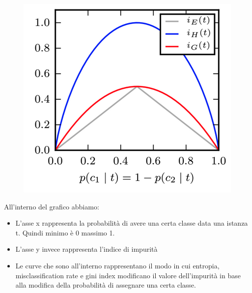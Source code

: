 \documentclass[14pt]{extreport}
\begin{document}
\begin{figure}[H]
	\centering
	\includegraphics[width=0.7\linewidth]{590.jpeg}
\end{figure}
All’interno del grafico abbiamo:
\begin{itemize}
	\item L’asse x rappresenta la probabilità di avere una certa classe data una istanza t. Quindi minimo è 0 massimo 1.
	\item L’asse y invece rappresenta l’indice di impurità
	\item Le curve che sono all’interno rappresentano il modo in cui entropia, misclassification rate e gini index modificano il valore dell’impurità
	in base alla modifica della probabilità di assegnare una certa classe.
\end{itemize}
\end{document}
